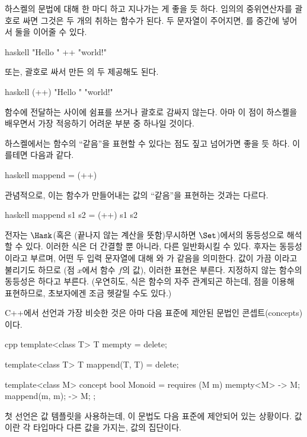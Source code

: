 하스켈의 문법에 대해 한 마디 하고 지나가는 게 좋을 듯 하다. 임의의 중위연산자를 괄호로 싸면 그것은 두 개의 \trArgument\를 취하는 함수가 된다.
두 문자열이 주어지면, \code{++}를 중간에 넣어서 둘을 이어줄 수 있다.

\begin{snip}{haskell}
"Hello " ++ "world!"
\end{snip}
또는, 괄호로 싸서 만든 \code{(++)}의 두 \trArgument\로 제공해도 된다.

\begin{snip}{haskell}
(++) "Hello " "world!"
\end{snip}
함수에 전달하는 \trArgument 사이에 쉼표를 쓰거나 \trArgument\를 괄호로 감싸지 않는다. 
아마 이 점이 하스켈을 배우면서 가장 적응하기 어려운 부분 중 하나일 것이다.

하스켈에서는 함수의 ``같음''을 표현할 수 있다는 점도 짚고 넘어가면 좋을 듯 하다. 이를테면 다음과 같다.

\begin{snip}{haskell}
mappend = (++)
\end{snip}
관념적으로, 이는 함수가 만들어내는 값의 ``같음''을 표현하는 것과는 다르다.

\begin{snip}{haskell}
mappend s1 s2 = (++) s1 s2
\end{snip}
전자는 \trCategory $\Hask$(혹은 \trBottom(끝나지 않는 계산을 뜻함)\을 무시하면 $\Set$)에서의  동등성으로 해석할 수 있다.
이러한 식은 더 간결할 뿐 아니라, 다른 \trCategory\로 일반화시킬 수 있다.
후자는 \newterm{\trExtensional} 동등성이라고 부르며,
어떤 두 입력 문자열에 대해 와 \code{(++)}가 같음을 의미한다.
 값이 가끔 이라고 불리기도 하므로 (점 $x$에서 함수 $f$의 값), 이러한 표현은 
\trPointWiseEquality{} 부른다.
\trArgument\를 지정하지 않는 함수의 동등성은 \newterm{\trPointFree}하다고 부른다.
(우연히도, \trPointFree 식은 함수의 \trComposition\과 자주 관계되곤 하는데, \trComposition\은 점을 이용해 표현하므로, 초보자에겐 조금 헷갈릴 수도 있다.)

C++에서 \trMonoid 선언과 가장 비슷한 것은 아마 다음 표준에 제안된 문법인 콘셉트(concepts)이다.

\begin{snip}{cpp}
template<class T>
  T mempty = delete;
  
template<class T>
  T mappend(T, T) = delete;
  
template<class M> 
  concept bool Monoid = requires (M m) { 
    { mempty<M> } -> M; 
    { mappend(m, m); } -> M;
  };
\end{snip}
첫 선언은 값 템플릿을 사용하는데, 이 문법도 다음 표준에 제안되어 있는 상황이다.
\trPolymorphic 값이란 각 타입마다 다른 값을 가지는, 값의 집단이다.

